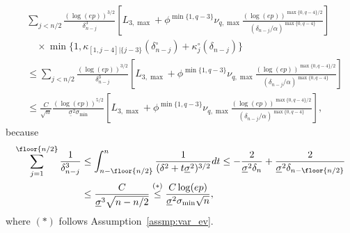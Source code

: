 \documentclass[aos]{imsart}
\begin{document}
\begin{equation*}
\begin{aligned}
    & \sum_{j < n/2} \frac{(\log(ep))^{3/2}}{\delta_{n-j}^3} \left[ 
        {L}_{3,\max} 
        + \phi^{\min\{1, q-3\}} \nu_{q,\max} \frac{ {(\log(ep))}^{\max\{0, q-4\}/2}}{(\delta_{n-j}/\alpha)^{\max\{0, q-4\}}}
    \right] \\
    & \quad \times \min\{ 1, \kappa_{[1,j-4]|\{j-3\}}(\delta_{n-j}^\circ) + \kappa^\circ_{j}(\delta_{n-j}) \} \\
    & \leq \sum_{j < n/2} \frac{(\log(ep))^{3/2}}{\delta_{n-j}^3} \left[ 
        {L}_{3,\max} 
        + \phi^{\min\{1, q-3\}} \nu_{q,\max} \frac{ {(\log(ep))}^{\max\{0, q-4\}/2}}{(\delta_{n-j}/\alpha)^{\max\{0, q-4\}}}
    \right] \\         
    & \leq \frac{C}{\sqrt{n}} \frac{(\log(ep))^{5/2}}{\underline{\sigma}^2\sigma_{\min}} 
    \left[ 
        {L}_{3,\max} 
        + \phi^{\min\{1, q-3\}} \nu_{q,\max} \frac{ {(\log(ep))}^{\max\{0, q-4\}/2}}{(\delta_{n-j}/\alpha)^{\max\{0, q-4\}}}
    \right],
\end{aligned}
\end{equation*}
because
\begin{equation} \label{eq:sum_delta_3}
\begin{aligned}
    \sum_{j=1}^{\floor{n/2}} \frac{1}{\delta_{n-j}^3} 
    & \le \int_{n-\floor{n/2}}^{n} \frac{1}{(\delta^2 + t\underline{\sigma}^2)^{3/2}}dt 
    \le -\frac{2}{\underline{\sigma}^2\delta_{n}} 
    + \frac{2}{\underline{\sigma}^2\delta_{n-\floor{n/2}}} \\
    & \le \frac{C}{\underline{\sigma}^3\sqrt{n-n/2}} 
    \overset{(*)}{\le} \frac{C \log(ep)}{\underline{\sigma}^2\sigma_{\min}\sqrt{n}},
\end{aligned}
\end{equation}
where $(*)$ follows Assumption~\eqref{assmp:var_ev}.
\end{document}
